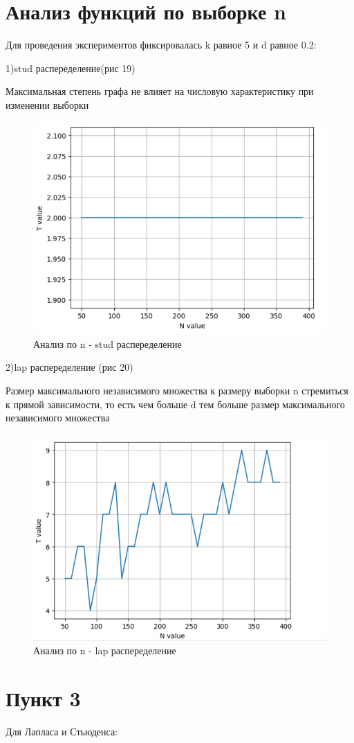 \documentclass{HSEtitle}
\begin{document}
\section{Анализ функций по выборке n}

Для проведения экспериментов фиксировалась k равное 5 и d равное 0.2:

1)stud распеределение(рис 19)

Максимальная степень графа не влияет на числовую характеристику при изменении выборки
\begin{figure}
    \centering
    \includegraphics[width=0.5\linewidth]{6.png}
    \caption{Анализ по n - stud распеределение}
    \label{fig:enter-label}
\end{figure}

2)lap распеределение (рис 20)

Размер максимального независимого множества к размеру выборки n стремиться к прямой зависимости, то есть чем больше d тем больше размер максимального независимого множества
\begin{figure}
    \centering
    \includegraphics[width=0.5\linewidth]{8.png}
    \caption{Анализ по n - lap распеределение}
    \label{fig:enter-label}
\end{figure}



\section{Пункт 3}

Для Лапласа и Стьюденса:
\end{document}

